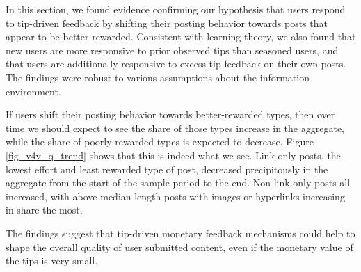In this section, we found evidence confirming our hypothesis that users respond to tip-driven feedback by shifting their posting behavior towards posts that appear to be better rewarded. Consistent with learning theory, we also found that new users are more responsive to prior observed tips than seasoned users, and that users are additionally responsive to excess tip feedback on their own posts. The findings were robust to various assumptions about the information environment.

If users shift their posting behavior towards better-rewarded types, then over time we should expect to see the share of those types increase in the aggregate, while the share of poorly rewarded types is expected to decrease. Figure \ref{fig_v4v_q_trend} shows that this is indeed what we see. Link-only posts, the lowest effort and least rewarded type of post, decreased precipitously in the aggregate from the start of the sample period to the end. Non-link-only posts all increased, with above-median length posts with images or hyperlinks increasing in share the most.  

The findings suggest that tip-driven monetary feedback mechanisms could help to shape the overall quality of user submitted content, even if the monetary value of the tips is very small. 

